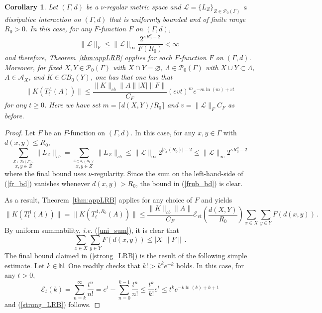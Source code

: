 \documentclass{article}
\newcommand{\E}{\mathscr{E}}
\newcommand{\<}{\langle}
\renewcommand{\>}{\rangle}
\let\emptyset\varnothing
\numberwithin{equation}{section}
\newtheorem{cor}[thm]{Corollary}
\theoremstyle{definition}
\begin{document}
%
%


\begin{cor} \label{cor:frLRB}
Let $(\Gamma, d)$ be a $\nu$-regular metric space and $\mathscr{L}= \{ L_Z \}_{Z \in \mathcal{P}_0(\Gamma)}$ a dissipative 
interaction on $(\Gamma, d)$ that is uniformly bounded and of finite range $R_0>0$. In this case,
for any $F$-function $F$ on $(\Gamma, d)$, 
\begin{equation} \label{frub_bd}
\| \mathscr{L} \|_F \leq \| \mathscr{L} \|_{\infty} \frac{2^{\kappa R_0^{\nu} -2}}{ F(R_0)} < \infty \, 
\end{equation}
and therefore, Theorem~\ref{thm:appLRB} applies for each $F$-function $F$ on $(\Gamma, d)$.  Moreover, for 
fixed $X,Y \in \mathcal{P}_0(\Gamma)$ with $X \cap Y = \emptyset$, $\Lambda \in \mathcal{P}_0( \Gamma)$ 
with $X \cup Y \subset \Lambda$, $A \in \mathcal{A}_X$, and $K\in CB_0(Y)$, one has that one has that
\begin{equation} \label{strong_LRB}
 \|K(T^{\Lambda}_t(A))\|  \leq   \frac{\|K\|_{cb}\|A\| |X| \| F \|}{C_F} (evt)^m e^{- m \ln(m) +vt}
\end{equation} 
for any $t \geq 0$. Here we have set $m = \lceil d(X,Y)/R_0\rceil$ and $v = \| \mathscr{L} \|_F C_F$ as before.
\end{cor}
\begin{proof}
Let $F$ be an $F$-function on $(\Gamma, d)$. In this case, for any $x,y \in \Gamma$ with $d(x,y) \leq R_0$,
\begin{equation} \label{fr_bd}
\sum_{\stackrel{Z \in \mathcal{P}_0(\Gamma):}{x,y \in Z}} \| L_Z \|_{cb}  = \sum_{\stackrel{Z \subset b_x(R_0):}{x,y \in Z}} \| L_Z \|_{cb} \leq \| \mathscr{L} \|_{\infty} 2^{|b_x(R_0)| -2}
\leq \| \mathscr{L} \|_{\infty} 2^{\kappa R_0^{\nu} -2}
\end{equation}
where the final bound uses $\nu$-regularity. Since the sum on the left-hand-side of (\ref{fr_bd}) vanishes whenever $d(x,y) > R_0$, the bound in (\ref{frub_bd}) is clear.

As a result, Theorem~\ref{thm:appLRB} applies for any choice of $F$ and yields
\begin{equation}
 \|K(T^{\Lambda}_t(A))\| =  \|K(T^{\Lambda, R_0}_t(A))\|  \leq  \frac{\|K\|_{cb}\|A\|}{C_F} \E_{vt}\left(\frac{d(X,Y)}{R_0}\right) \sum_{x\in X}\sum_{y\in Y} F(d(x,y)) \, .
\end{equation} 
By uniform summability, \textit{i.e.} (\ref{uni_sum}), it is clear that
\begin{equation}
\sum_{x \in X} \sum_{y \in Y} F(d(x,y)) \leq |X| \| F \| \, .
\end{equation}
The final bound claimed in (\ref{strong_LRB}) is the result of the following simple estimate. 
Let $k \in \mathbb{N}$. One readily checks that $k! > k^ke^{-k}$ holds. In this case, for any 
$t>0$,
\begin{equation}
\E_t(k) = \sum_{n=k}^{\infty} \frac{t^n}{n!} = e^t - \sum_{n=0}^{k-1}  \frac{t^n}{n!} \leq \frac{t^k}{k!} e^t  \leq t^k e^{-k \ln(k) + k +t} 
\end{equation}
and (\ref{strong_LRB}) follows. 
\end{proof}
\end{document}
